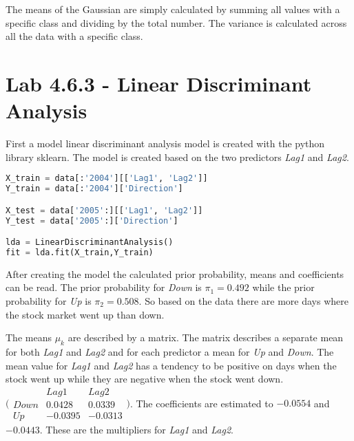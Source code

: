 The means of the Gaussian are simply calculated by summing all values with a specific class and dividing by the total number.
The variance is calculated across all the data with a specific class.

\section{Lab 4.6.3 - Linear Discriminant Analysis}
First a model linear discriminant analysis model is created with the python library sklearn. The model is created based on the two predictors \emph{Lag1} and \emph{Lag2}. 


\begin{lstlisting}[language=Python, label=lst:ldaModel, caption=creating linear discriminant analysis model sklearn]
X_train = data[:'2004'][['Lag1', 'Lag2']]
Y_train = data[:'2004']['Direction']

X_test = data['2005':][['Lag1', 'Lag2']]
Y_test = data['2005':]['Direction']

lda = LinearDiscriminantAnalysis()
fit = lda.fit(X_train,Y_train)
\end{lstlisting}

After creating the model the calculated prior probability, means and coefficients can be read. The prior probability for \emph{Down} is $\pi_1=0.492$ while the prior probability for \emph{Up} is $\pi_2=0.508$. So based on the data there are more days where the stock market went up than down. 

The means $\mu_k$ are described by a matrix. The matrix describes a separate mean for both \emph{Lag1} and \emph{Lag2} and for each predictor a mean for \emph{Up} and \emph{Down}. The mean value for \emph{Lag1} and \emph{Lag2} has a tendency to be positive on days when the stock went up while they are negative when the stock went down.  $\bigl( \begin{smallmatrix} 	 & Lag1 & Lag2	\\ 	 Down & 0.0428 & 0.0339 \\ 	 Up & -0.0395 & -0.0313 \end{smallmatrix} \bigr) $. The coefficients are estimated to $-0.0554$ and $-0.0443$. These are the multipliers for \emph{Lag1} and \emph{Lag2}.

%
%

